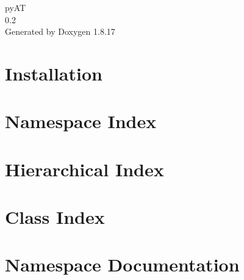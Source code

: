 \let\mypdfximage\pdfximage\def\pdfximage{\immediate\mypdfximage}\documentclass[twoside]{book}
\newcommand{\+}{\discretionary{\mbox{\scriptsize$\hookleftarrow$}}{}{}}
\newcommand{\clearemptydoublepage}{%
  \newpage{\pagestyle{empty}\cleardoublepage}%
}
\begin{document}
\hypersetup{pageanchor=false,
             bookmarksnumbered=true,
             pdfencoding=unicode
            }
\begin{titlepage}
\vspace*{7cm}
\begin{center}%
{\Large py\+AT \\[1ex]\large 0.\+2 }\\
\vspace*{1cm}
{\large Generated by Doxygen 1.8.17}\\
\end{center}
\end{titlepage}
\clearemptydoublepage
{}
\tableofcontents
\clearemptydoublepage
{}
\hypersetup{pageanchor=true}

\chapter{Installation}
\label{index}\hypertarget{index}{}
\chapter{Namespace Index}

\chapter{Hierarchical Index}

\chapter{Class Index}

\chapter{Namespace Documentation}




































\end{document}
